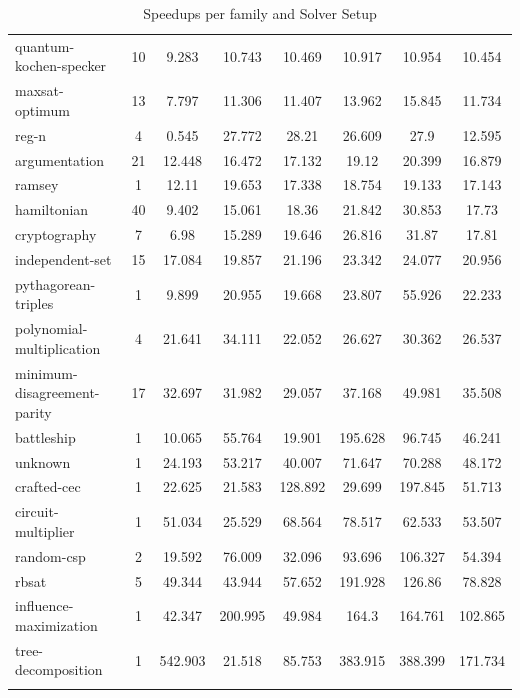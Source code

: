 \documentclass[12pt,a4paper,twoside]{scrartcl}
\numberwithin{equation}{section}
\begin{document}
\begin{longtable}{ l|c|c|c|c|c|c|c }
    quantum-kochen-specker	&	10	&	9.283	&	10.743	&	10.469	&	10.917	&	10.954	&	10.454\\
    maxsat-optimum	&	13	&	7.797	&	11.306	&	11.407	&	13.962	&	15.845	&	11.734\\
    reg-n	&	4	&	0.545	&	27.772	&	28.21	&	26.609	&	27.9	&	12.595\\
    argumentation	&	21	&	12.448	&	16.472	&	17.132	&	19.12	&	20.399	&	16.879\\
    ramsey	&	1	&	12.11	&	19.653	&	17.338	&	18.754	&	19.133	&	17.143\\
    hamiltonian	&	40	&	9.402	&	15.061	&	18.36	&	21.842	&	30.853	&	17.73\\
    cryptography	&	7	&	6.98	&	15.289	&	19.646	&	26.816	&	31.87	&	17.81\\
    independent-set	&	15	&	17.084	&	19.857	&	21.196	&	23.342	&	24.077	&	20.956\\
    pythagorean-triples	&	1	&	9.899	&	20.955	&	19.668	&	23.807	&	55.926	&	22.233\\
    polynomial-multiplication	&	4	&	21.641	&	34.111	&	22.052	&	26.627	&	30.362	&	26.537\\
    minimum-disagreement-parity	&	17	&	32.697	&	31.982	&	29.057	&	37.168	&	49.981	&	35.508\\
    battleship	&	1	&	10.065	&	55.764	&	19.901	&	195.628	&	96.745	&	46.241\\
    unknown	&	1	&	24.193	&	53.217	&	40.007	&	71.647	&	70.288	&	48.172\\
    crafted-cec	&	1	&	22.625	&	21.583	&	128.892	&	29.699	&	197.845	&	51.713\\
    circuit-multiplier	&	1	&	51.034	&	25.529	&	68.564	&	78.517	&	62.533	&	53.507\\
    random-csp	&	2	&	19.592	&	76.009	&	32.096	&	93.696	&	106.327	&	54.394\\
    rbsat	&	5	&	49.344	&	43.944	&	57.652	&	191.928	&	126.86	&	78.828\\
    influence-maximization	&	1	&	42.347	&	200.995	&	49.984	&	164.3	&	164.761	&	102.865\\
    tree-decomposition	&	1	&	542.903	&	21.518	&	85.753	&	383.915	&	388.399	&	171.734\\
  \caption{Speedups per family and Solver Setup}
  \label{tab:speedupsFamiliesComplete}
\end{longtable}



\end{document}
